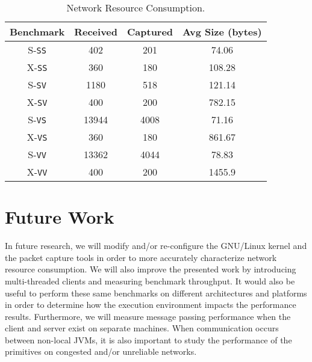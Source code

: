 \documentclass{sig-alternate}
\begin{document}
\begin{table}[t]

  \vspace*{.05in}
  \begin{center}
  \begin{tabular}{| c | c | c | c |}
  \hline
  Benchmark & Received & Captured &  Avg Size (bytes)\\
  \hline
  S-\texttt{SS} & 402 & 201 & 74.06\\
  X-\texttt{SS} & 360 & 180 & 108.28\\
  \hline
  S-\texttt{SV} & 1180 & 518 & 121.14\\
  X-\texttt{SV} & 400 & 200 & 782.15\\
  \hline
  S-\texttt{VS} & 13944 & 4008 & 71.16\\
  X-\texttt{VS} & 360 & 180 & 861.67\\
  \hline
  S-\texttt{VV} & 13362 & 4044 & 78.83\\
  X-\texttt{VV} & 400 & 200 & 1455.9\\
  \hline
  \end{tabular}
\end{center}

\vspace*{-.1in}

  \caption{Network Resource Consumption.}
  \label{tab:sover}
  \vspace*{-.1in}

\end{table}

\section{Future Work}
\label{sec:future-work}

In future research, we will modify and/or re-configure the GNU/Linux
kernel and the packet capture tools in order to more accurately
characterize network resource consumption.  We will also improve the
presented work by introducing multi-threaded clients and measuring
benchmark throughput.  It would also be useful to perform these same
benchmarks on different architectures and platforms in order to
determine how the execution environment impacts the performance
results.  Furthermore, we will measure message passing performance
when the client and server exist on separate machines.  When
communication occurs between non-local JVMs, it is also important to
study the performance of the primitives on congested and/or unreliable
networks.
\end{document}
